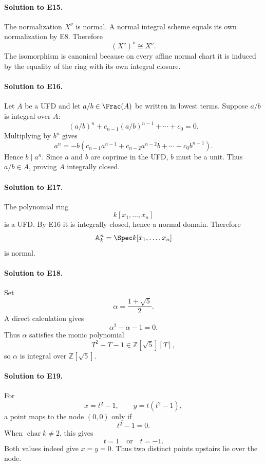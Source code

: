 \paragraph{Solution to E15.}
The normalization \(X^\nu\) is normal.  A normal integral scheme equals its own normalization by
E8.  Therefore
\[
(X^\nu)^\nu\cong X^\nu.
\]
The isomorphism is canonical because on every affine normal chart it is induced by the equality of
the ring with its own integral closure.

\paragraph{Solution to E16.}
Let \(A\) be a UFD and let \(a/b\in\Frac(A)\) be written in lowest terms.  Suppose \(a/b\) is
integral over \(A\):
\[
(a/b)^n+c_{n-1}(a/b)^{n-1}+\cdots+c_0=0.
\]
Multiplying by \(b^n\) gives
\[
a^n=-b(c_{n-1}a^{n-1}+c_{n-2}a^{n-2}b+\cdots+c_0b^{n-1}).
\]
Hence \(b\mid a^n\).  Since \(a\) and \(b\) are coprime in the UFD, \(b\) must be a unit.
Thus \(a/b\in A\), proving \(A\) integrally closed.

\paragraph{Solution to E17.}
The polynomial ring
\[
k[x_1,\ldots,x_n]
\]
is a UFD.  By E16 it is integrally closed, hence a normal domain.  Therefore
\[
\mathbb A^n_k=\Spec k[x_1,\ldots,x_n]
\]
is normal.

\paragraph{Solution to E18.}
Set
\[
\alpha=\frac{1+\sqrt5}{2}.
\]
A direct calculation gives
\[
\alpha^2-\alpha-1=0.
\]
Thus \(\alpha\) satisfies the monic polynomial
\[
T^2-T-1\in\mathbb Z[\sqrt5][T],
\]
so \(\alpha\) is integral over \(\mathbb Z[\sqrt5]\).

\paragraph{Solution to E19.}
For
\[
x=t^2-1,\qquad y=t(t^2-1),
\]
a point maps to the node \((0,0)\) only if
\[
t^2-1=0.
\]
When \(\operatorname{char}k\ne2\), this gives
\[
t=1\quad\text{or}\quad t=-1.
\]
Both values indeed give \(x=y=0\).  Thus two distinct points upstairs lie over the node.

